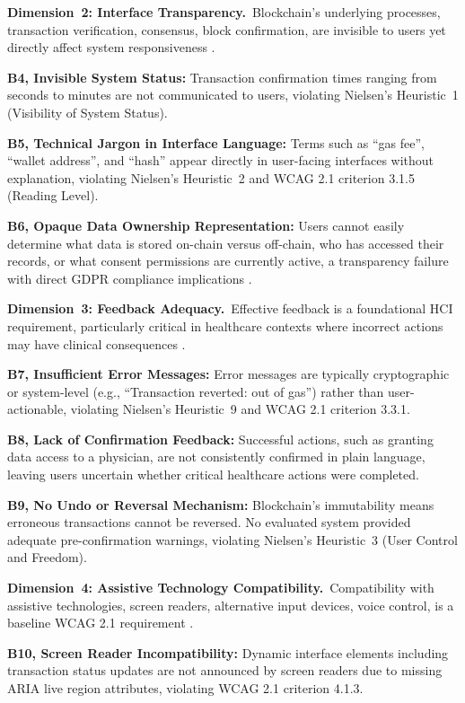 \documentclass[journal,onecolumn]{IEEEtran}
\begin{document}
\noindent\textbf{Dimension~2: Interface Transparency.}\ Blockchain's underlying processes, transaction verification, consensus, block confirmation, are invisible to users yet directly affect system responsiveness \cite{frohlich2022blockchain}.

\textbf{B4, Invisible System Status:} Transaction confirmation times ranging from seconds to minutes are not communicated to users, violating Nielsen's Heuristic~1 (Visibility of System Status).

\textbf{B5, Technical Jargon in Interface Language:} Terms such as ``gas fee'', ``wallet address'', and ``hash'' appear directly in user-facing interfaces without explanation, violating Nielsen's Heuristic~2 and WCAG 2.1 criterion 3.1.5 (Reading Level).

\textbf{B6, Opaque Data Ownership Representation:} Users cannot easily determine what data is stored on-chain versus off-chain, who has accessed their records, or what consent permissions are currently active, a transparency failure with direct GDPR compliance implications \cite{frohlich2022blockchain,yaqub2025blockchain}.

\noindent\textbf{Dimension~3: Feedback Adequacy.}\ Effective feedback is a foundational HCI requirement, particularly critical in healthcare contexts where incorrect actions may have clinical consequences \cite{tharani2022ui}.

\textbf{B7, Insufficient Error Messages:} Error messages are typically cryptographic or system-level (e.g., ``Transaction reverted: out of gas'') rather than user-actionable, violating Nielsen's Heuristic~9 and WCAG 2.1 criterion 3.3.1.

\textbf{B8, Lack of Confirmation Feedback:} Successful actions, such as granting data access to a physician, are not consistently confirmed in plain language, leaving users uncertain whether critical healthcare actions were completed.

\textbf{B9, No Undo or Reversal Mechanism:} Blockchain's immutability means erroneous transactions cannot be reversed. No evaluated system provided adequate pre-confirmation warnings, violating Nielsen's Heuristic~3 (User Control and Freedom).

\noindent\textbf{Dimension~4: Assistive Technology Compatibility.}\ Compatibility with assistive technologies, screen readers, alternative input devices, voice control, is a baseline WCAG 2.1 requirement \cite{khalid2023blockchain}.

\textbf{B10, Screen Reader Incompatibility:} Dynamic interface elements including transaction status updates are not announced by screen readers due to missing ARIA live region attributes, violating WCAG 2.1 criterion 4.1.3.
\end{document}
